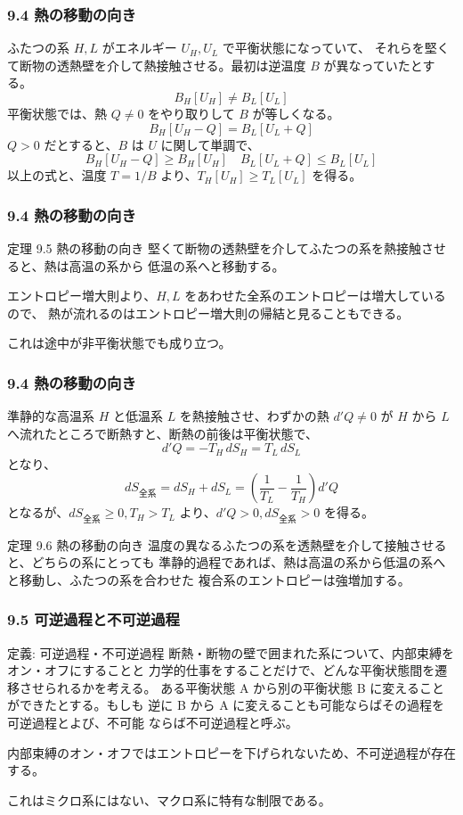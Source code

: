 \documentclass[aspectratio=149]{beamer}
\begin{document}
\begin{frame}
	\frametitle{9.4 熱の移動の向き}
	ふたつの系 \(H, L\) がエネルギー \(U_H, U_L\) で平衡状態になっていて、
	それらを堅くて断物の透熱壁を介して熱接触させる。最初は逆温度 \(B\) が異なっていたとする。
	\[B_H[U_H]\neq B_L[U_L]\tag{9.5}\]
	平衡状態では、熱 \(Q\neq0\) をやり取りして \(B\) が等しくなる。
	\[B_H[U_H-Q]=B_L[U_L+Q]\tag{9.6}\]
	\(Q>0\) だとすると、\(B\) は \(U\) に関して単調で、
	\[B_H[U_H-Q]\geq B_H[U_H]\quad B_L[U_L+Q]\leq B_L[U_L]\tag{9.7}\]
	以上の式と、温度 \(T=1/B\) より、\(T_H[U_H]\geq T_L[U_L]\) を得る。
\end{frame}

\begin{frame}
	\frametitle{9.4 熱の移動の向き}
	\begin{block}{定理 9.5 熱の移動の向き}
		堅くて断物の透熱壁を介してふたつの系を熱接触させると、熱は高温の系から
		低温の系へと移動する。
	\end{block}
	エントロピー増大則より、\(H, L\) をあわせた全系のエントロピーは増大しているので、
	熱が流れるのはエントロピー増大則の帰結と見ることもできる。
	
	これは途中が非平衡状態でも成り立つ。
\end{frame}

\begin{frame}
	\frametitle{9.4 熱の移動の向き}
	準静的な高温系 \(H\) と低温系 \(L\) を熱接触させ、わずかの熱 \(d'Q\neq0\) が
	\(H\) から \(L\) へ流れたところで断熱すと、断熱の前後は平衡状態で、
	\[d'Q=-T_H\,dS_H=T_L\,dS_L\tag{9.9}\]
	となり、
	\[dS_\text{全系}=dS_H+dS_L=\left(\frac{1}{T_L}-\frac{1}{T_H}\right)d'Q\tag{9.10}\]
	となるが、\(dS_\text{全系}\geq0,T_H>T_L\) より、\(d'Q>0,dS_\text{全系}>0\) を得る。
	\begin{block}{定理 9.6 熱の移動の向き}
		温度の異なるふたつの系を透熱壁を介して接触させると、どちらの系にとっても
		準静的過程であれば、熱は高温の系から低温の系へと移動し、ふたつの系を合わせた
		複合系のエントロピーは強増加する。
	\end{block}
\end{frame}

\begin{frame}
	\frametitle{9.5 可逆過程と不可逆過程}
	\begin{block}{定義: 可逆過程・不可逆過程}
		断熱・断物の壁で囲まれた系について、内部束縛をオン・オフにすることと
		力学的仕事をすることだけで、どんな平衡状態間を遷移させられるかを考える。
		ある平衡状態 A から別の平衡状態 B に変えることができたとする。もしも
		逆に B から A に変えることも可能ならばその過程を可逆過程とよび、不可能
		ならば不可逆過程と呼ぶ。
	\end{block}
	内部束縛のオン・オフではエントロピーを下げられないため、不可逆過程が存在する。
	
	これはミクロ系にはない、マクロ系に特有な制限である。
\end{frame}
\end{document}

